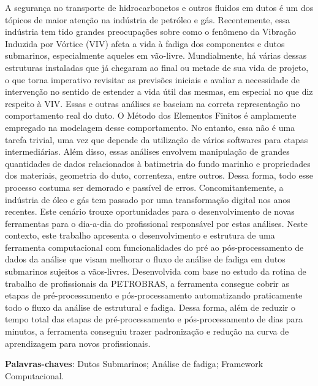 
\setlength{\absparsep}{18pt} %
\begin{resumo}

    A segurança no transporte de hidrocarbonetos e outros fluidos em dutos é um dos tópicos de maior atenção na indústria de petróleo e gás.
    Recentemente, essa indústria tem tido grandes preocupações sobre como o fenômeno da Vibração Induzida por Vórtice (VIV) afeta a vida à fadiga dos componentes e dutos submarinos, especialmente aqueles em vão-livre. %
    Mundialmente, há várias dessas estruturas instaladas que já chegaram ao final ou metade de sua vida de projeto, o que torna imperativo revisitar as previsões iniciais e avaliar a necessidade de intervenção no sentido de estender a vida útil das mesmas, em especial no que diz respeito à VIV.
    Essas e outras análises se baseiam na correta representação no comportamento real do duto.
    O Método dos Elementos Finitos é amplamente empregado na modelagem desse comportamento.
    No entanto, essa não é uma tarefa trivial, uma vez que depende da utilização de vários softwares para etapas intermediárias.
    Além disso, essas análises envolvem manipulação de grandes quantidades de dados relacionados à batimetria do fundo marinho e propriedades dos materiais, geometria do duto, correnteza, entre outros.
    Dessa forma, todo esse processo costuma ser demorado e passível de erros.
    Concomitantemente, a indústria de óleo e gás tem passado por uma transformação digital nos anos recentes.
    Este cenário trouxe oportunidades para o desenvolvimento de novas ferramentas para o dia-a-dia do profissional responsável por estas análises.
    Neste contexto, este trabalho apresenta o desenvolvimento e estrutura de uma ferramenta computacional com funcionalidades do pré ao pós-processamento de dados da análise que visam melhorar o fluxo de análise de fadiga em dutos submarinos sujeitos a vãos-livres.
    Desenvolvida com base no estudo da rotina de trabalho de profissionais da PETROBRAS, a ferramenta consegue cobrir as etapas de pré-processamento e pós-processamento automatizando praticamente todo o fluxo da análise de estrutural e fadiga.
    Dessa forma, além de reduzir o tempo total das etapas de pré-processamento e pós-processamento de dias para minutos, a ferramenta conseguiu trazer padronização e redução na curva de aprendizagem para novos profissionais.

 \textbf{Palavras-chaves}: Dutos Submarinos; Análise de fadiga; Framework Computacional.
\end{resumo}

